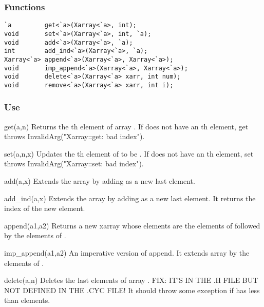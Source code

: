 \subsubsection*{Functions}
\begin{verbatim}
`a         get<`a>(Xarray<`a>, int);
void       set<`a>(Xarray<`a>, int, `a);
void       add<`a>(Xarray<`a>, `a);
int        add_ind<`a>(Xarray<`a>, `a);
Xarray<`a> append<`a>(Xarray<`a>, Xarray<`a>);
void       imp_append<`a>(Xarray<`a>, Xarray<`a>);
void       delete<`a>(Xarray<`a> xarr, int num);
void       remove<`a>(Xarray<`a> xarr, int i);
\end{verbatim}

\subsubsection*{Use}

\begin{defun}{get}{(a,n)}
Returns the th element of array .  If  does not
have an th element, get throws InvalidArg("Xarray::get: bad
index").
\end{defun}

\begin{defun}{set}{(a,n,x)}
Updates the th element of  to be .  If  does
not have an th element, set throws InvalidArg("Xarray::set: bad
index").
\end{defun}

\begin{defun}{add}{(a,x)}
Extends the array  by adding  as a new last element.
\end{defun}

\begin{defun}{add_ind}{(a,x)}
Extends the array  by adding  as a new last element.  It
returns the index of the new element.
\end{defun}

\begin{defun}{append}{(a1,a2)}
Returns a new xarray whose elements are the elements of 
followed by the elements of .
\end{defun}

\begin{defun}{imp_append}{(a1,a2)}
An imperative version of append.  It extends array  by the
elements of .
\end{defun}

\begin{defun}{delete}{(a,n)}
Deletes the last  elements of array .  FIX: IT'S IN THE .H
FILE BUT NOT DEFINED IN THE .CYC FILE!  It should throw some exception
if  has less than  elements.
\end{defun}


